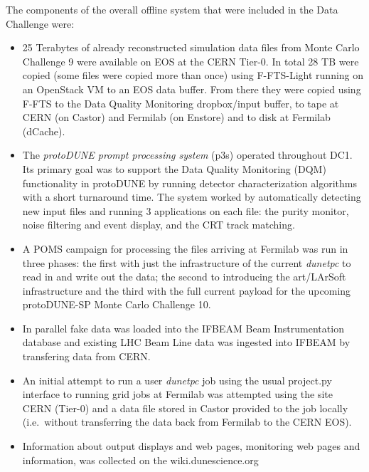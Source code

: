 \documentclass[pdftex,12pt,letter]{article}
\newcommand{\pd}{protoDUNE\xspace}
\newcommand{\dtpc}{\textit{dunetpc}\xspace}
\begin{document}
The components of the overall offline system that were included in the Data Challenge were:
\begin{itemize}


\item 25 Terabytes of already reconstructed simulation data files from Monte Carlo Challenge 9 were available on EOS at the CERN Tier-0.
In total 28 TB  were copied (some files were copied more than once) using F-FTS-Light running on an OpenStack VM to an EOS data buffer.
From there they were copied using F-FTS to the Data Quality Monitoring dropbox/input buffer, to tape at CERN (on Castor) and Fermilab
(on Enstore) and to disk at Fermilab (dCache). 

\item   The \textit{protoDUNE prompt processing system} (p3s) operated throughout DC1. Its primary goal was to support
the Data Quality Monitoring (DQM)  functionality in \pd by running detector characterization algorithms with a short turnaround time.
The system worked by automatically detecting new input files and running 3 applications on each file: the purity monitor,
noise filtering and event display, and the CRT track matching. 

\item A POMS campaign for processing the files arriving at Fermilab was run in three phases: the first with just the infrastructure
of the current \dtpc to read in and write out the data; the second to introducing the art/LArSoft infrastructure and the third with the full current payload for the
upcoming protoDUNE-SP Monte Carlo Challenge 10. 

\item In parallel fake data was loaded into the IFBEAM Beam Instrumentation database and existing LHC Beam Line data was ingested into IFBEAM by transfering data from CERN.

\item An initial attempt to run a user \dtpc job using the  usual project.py interface to running grid jobs at Fermilab was
attempted using the site CERN (Tier-0) and a data file stored in Castor provided to the job locally (i.e.~without transferring
the data back from Fermilab to the CERN EOS). 

\item Information about output displays and web pages, monitoring web pages and information, was collected on the wiki.dunescience.org

\end{itemize}
\end{document}
